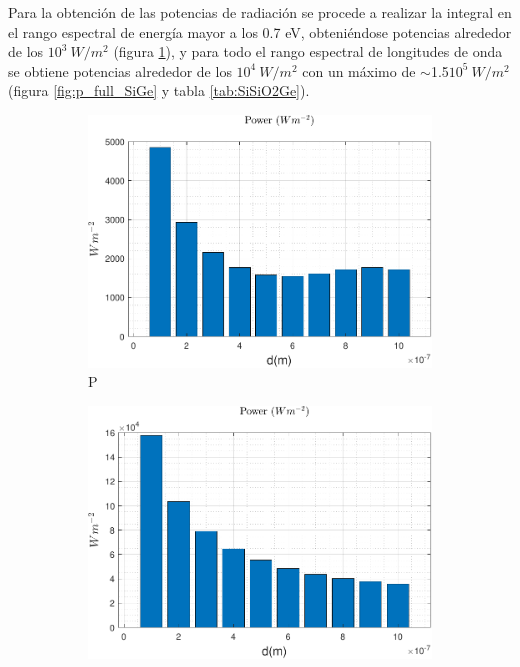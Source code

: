 Para la obtención de las potencias de radiación se procede a realizar la integral en el rango espectral de energía mayor a los 0.7 eV, obteniéndose potencias alrededor de los $10^3 \ W/m^2$ (figura \ref{fig:p_Eg_SiGe}), y para todo el rango espectral de longitudes de onda se obtiene potencias alrededor de los $10^4 \ W/m^2$ con un máximo de $\sim$1.5$10^5 \ W/m^2$ (figura \ref{fig:p_full_SiGe} y tabla \ref{tab:SiSiO2Ge}). 
\begin{figure}[H]
\centering
\begin{subfigure}[b]{0.49\textwidth}
	\centering
		\includegraphics[width=1.00\textwidth]{figuras/Resultados/radiacion/p_Eg_SiGe.pdf}
	\caption{P }
	\label{fig:p_Eg_SiGe}
\end{subfigure}
\hfill
\begin{subfigure}[b]{0.49\textwidth}
	\centering
		\includegraphics[width=1.00\textwidth]{figuras/Resultados/radiacion/p_full_SiGe.pdf}

\end{subfigure}
\end{figure}
